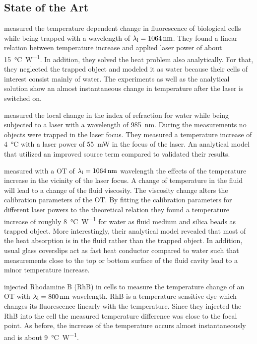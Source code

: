 \subsection{State of the Art}\label{sec:TO-state}

 measured the temperature dependent change in fluorescence of 
biological cells while being trapped with a wavelength of 
$\lal=\SI{1064}{\nm}$. They found a linear relation between temperature 
increase and applied laser power of about \SI{15}{\degreeCelsius\per\watt}. In 
addition, they solved the heat problem also analytically. For that, they 
neglected the trapped object and modeled it as water because their cells of 
interest consist mainly of water. The experiments as well as the analytical 
solution show an almost instantaneous change in temperature after the laser is 
switched on.

 measured the local change in the index of refraction for 
water while being subjected to a laser with a wavelength of \SI{985}{\nm}. 
During the measurements no objects were trapped in the laser focus. They 
measured a temperature increase of \SI{4}{\degreeCelsius} with a laser power of 
\SI{55}{\milli\watt} in the focus of the laser. An analytical model that 
utilized an improved source term compared to \cite{Liu1995} validated their 
results.

 measured with a OT of $\lal=\SI{1064}{\nm}$ wavelength the 
effects of the temperature increase in the vicinity of the laser focus. A 
change of temperature in the fluid will lead to a change of the fluid 
viscosity. The viscosity change alters the calibration parameters of the OT. By 
fitting the calibration parameters for different laser powers to the 
theoretical relation they found a temperature increase of roughly 
\SI{8}{\degreeCelsius\per\watt} for water as fluid medium and silica beads as 
trapped object. More interestingly, their analytical model revealed that most 
of the heat absorption is in the fluid rather than the trapped object. In 
addition, usual glass coverslips act as fast heat conductor compared to water 
such that measurements close to the top or bottom surface of the fluid cavity 
lead to a minor temperature increase.

 injected Rhodamine B (RhB) in cells to measure the 
temperature change of an OT with $\lal=\SI{800}{\nm}$ wavelength. RhB is a 
temperature sensitive dye which changes its fluorescence linearly with the 
temperature. Since they injected the RhB into the cell the measured 
temperature difference was close to the focal point. As before, the increase of 
the temperature occurs almost instantaneously and is about 
\SI{9}{\degreeCelsius\per\watt}.

